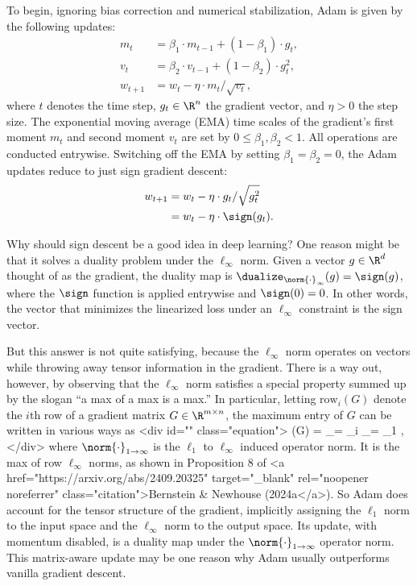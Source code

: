 To begin, ignoring bias correction and numerical stabilization, Adam is given by the following updates:
\begin{align}
    m_t &= \beta_1 \cdot m_{t-1} + (1 - \beta_1) \cdot g_t, \\
    v_t &= \beta_2 \cdot v_{t-1} + (1 - \beta_2) \cdot g_t^2, \\
    w_{t+1} &= w_t - \eta \cdot m_t / \sqrt{v_t},
\end{align}
where $t$ denotes the time step, $g_t \in \R^n$ the gradient vector, and $\eta > 0$ the step size. The exponential moving average (EMA) time scales of the gradient's first moment $m_t$ and second moment $v_t$ are set by $0 \leq \beta_1, \beta_2 < 1$. All operations are conducted entrywise. Switching off the EMA by setting $\beta_1 = \beta_2 = 0$, the Adam updates reduce to just sign gradient descent:
\begin{align}
    w_{t+1} &= w_t - \eta \cdot g_t / \sqrt{g_t^{2}} \label{eq:funky-adam} \\
    &= w_t - \eta \cdot \sign(g_t) \label{eq:sign-adam}.
\end{align}

Why should sign descent be a good idea in deep learning? One reason might be that it solves a duality problem under the $\ell_\infty$ norm. Given a vector $g \in \R^d$ thought of as the gradient, the duality map is $\dualize_{\norm{\cdot}_\infty}(g) = \sign(g)$, where the $\sign$ function is applied entrywise and $\sign(0) = 0$. In other words, the vector that minimizes the linearized loss under an $\ell_\infty$ constraint is the sign vector.

But this answer is not quite satisfying, because the $\ell_\infty$ norm operates on vectors while throwing away tensor information in the gradient. There is a way out, however, by observing that the $\ell_\infty$ norm satisfies a special property summed up by the slogan “a max of a max is a max.” In particular, letting $\text{row}_i(G)$ denote the $i$th row of a gradient matrix $G \in \R^{m \times n}$, the maximum entry of $G$ can be written in various ways as <div id="" class="equation">    \max(G) = _\infty = \max_i _\infty = _{1 \to \infty},</div> where $\norm{\cdot}_{1 \to \infty}$ is the $\ell_1$ to $\ell_\infty$ induced operator norm. It is the max of row $\ell_\infty$ norms, as shown in Proposition 8 of <a href="https://arxiv.org/abs/2409.20325" target="_blank" rel="noopener noreferrer" class="citation">Bernstein & Newhouse (2024a</a>). So Adam does account for the tensor structure of the gradient, implicitly assigning the $\ell_1$ norm to the input space and the $\ell_\infty$ norm to the output space. Its update, with momentum disabled, is a duality map under the $\norm{\cdot}_{1\to\infty}$ operator norm. This matrix-aware update may be one reason why Adam usually outperforms vanilla gradient descent.


